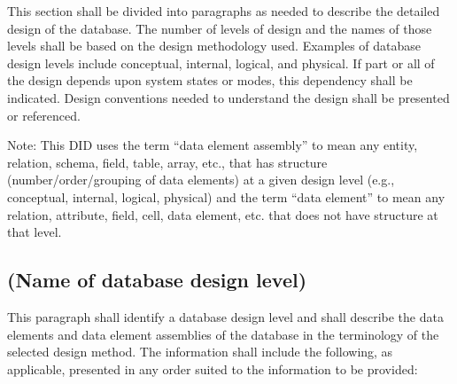 \documentclass{fidata-report-template}
\begin{document}
This section shall be divided into paragraphs as needed to describe the
detailed design of the database. The number of levels of design and the
names of those levels shall be based on the design methodology used.
Examples of database design levels include conceptual, internal,
logical, and physical. If part or all of the design depends upon system
states or modes, this dependency shall be indicated. Design conventions
needed to understand the design shall be presented or referenced.

Note: This DID uses the term ``data element assembly'' to mean any
entity, relation, schema, field, table, array, etc., that has structure
(number/order/grouping of data elements) at a given design level (e.g.,
conceptual, internal, logical, physical) and the term ``data element''
to mean any relation, attribute, field, cell, data element, etc. that
does not have structure at that level.

\subsection{(Name of database design level)}

This paragraph shall identify a database design level and shall describe
the data elements and data element assemblies of the database in the
terminology of the selected design method. The information shall include
the following, as applicable, presented in any order suited to the
information to be provided:
\end{document}

